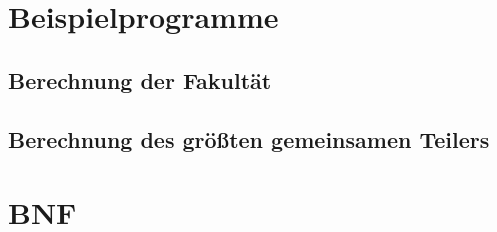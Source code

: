 \documentclass[a4paper]{article}
\begin{document}
\section{Beispielprogramme}

\subsection{Berechnung der Fakultät}



\subsection{Berechnung des größten gemeinsamen Teilers}



\section{BNF}


\end{document}
